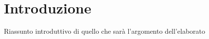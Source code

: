 \chapter{Introduzione}
\label{cha:intro}
Riassunto introduttivo di quello che sarà l'argomento dell'elaborato
